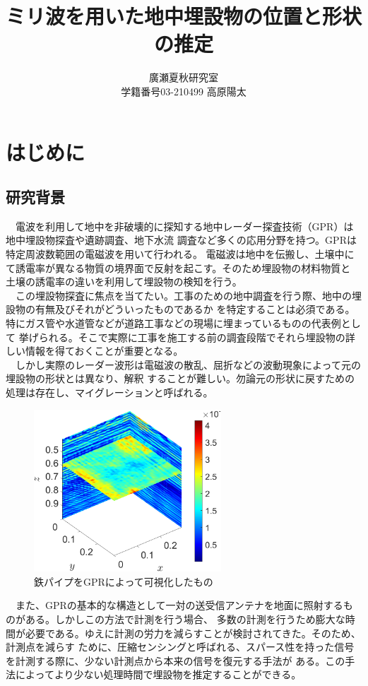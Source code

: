 \documentclass[a4paper,12pt]{jsreport}
\title{ミリ波を用いた地中埋設物の位置と形状の推定}
\author{廣瀬夏秋研究室\\
学籍番号03-210499 高原陽太}
\begin{document}
\maketitle
\tableofcontents
\clearpage
\chapter{はじめに}
\section{研究背景}
　電波を利用して地中を非破壊的に探知する地中レーダー探査技術（GPR）は地中埋設物探査や遺跡調査、地下水流
調査など多くの応用分野を持つ\cite{radar1}\cite{radar2}。GPRは特定周波数範囲の電磁波を用いて行われる。
電磁波は地中を伝搬し、土壌中にて誘電率が異なる物質の境界面で反射を起こす。そのため埋設物の材料物質と
土壌の誘電率の違いを利用して埋設物の検知を行う。
\\　この埋設物探査に焦点を当てたい。工事のための地中調査を行う際、地中の埋設物の有無及びそれがどういったものであるか
を特定することは必須である。特にガス管や水道管などが道路工事などの現場に埋まっているものの代表例として
挙げられる。そこで実際に工事を施工する前の調査段階でそれら埋設物の詳しい情報を得ておくことが重要となる。
\\　しかし実際のレーダー波形は電磁波の散乱、屈折などの波動現象によって元の埋設物の形状とは異なり、解釈
することが難しい。勿論元の形状に戻すための処理は存在し、マイグレーションと呼ばれる。


\begin{figure}[h]
  \begin{center}
   \includegraphics[width=7cm]{./image/0918.png}
   
  \caption{鉄パイプをGPRによって可視化したもの}\label{鉄パイプをGPRによって可視化したもの}
  \end{center}
  \end{figure}

　また、GPRの基本的な構造として一対の送受信アンテナを地面に照射するものがある。しかしこの方法で計測を行う場合、
多数の計測を行うため膨大な時間が必要である。ゆえに計測の労力を減らすことが検討されてきた。そのため、計測点を減らす
ために、圧縮センシングと呼ばれる、スパース性を持った信号を計測する際に、少ない計測点から本来の信号を復元する手法が
ある。この手法によってより少ない処理時間で埋設物を推定することができる。
\end{document}
